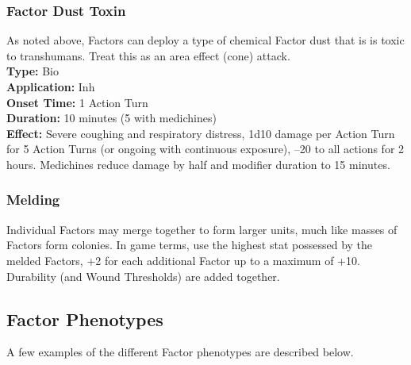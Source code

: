 \subsubsection{Factor Dust Toxin} 

As noted above, Factors can deploy a type of chemical Factor dust that is is toxic to transhumans. Treat this as an area effect (cone) attack. \\ \textbf{Type:} Bio \\ \textbf{Application:} Inh \\ \textbf{Onset Time:} 1 Action Turn \\ \textbf{Duration:} 10 minutes (5 with medichines) \\ \textbf{Effect:} Severe coughing and respiratory distress, 1d10 damage per Action Turn for 5 Action Turns (or ongoing with continuous exposure), –20 to all actions for 2 hours. Medichines reduce damage by half and modifier duration to 15 minutes. 

\subsubsection{Melding} 

Individual Factors may merge together to form larger units, much like masses of Factors form colonies. In game terms, use the highest stat possessed by the melded Factors, +2 for each additional Factor up to a maximum of +10. Durability (and Wound Thresholds) are added together. 

\subsection{Factor Phenotypes } 

A few examples of the different Factor phenotypes are described below. 

